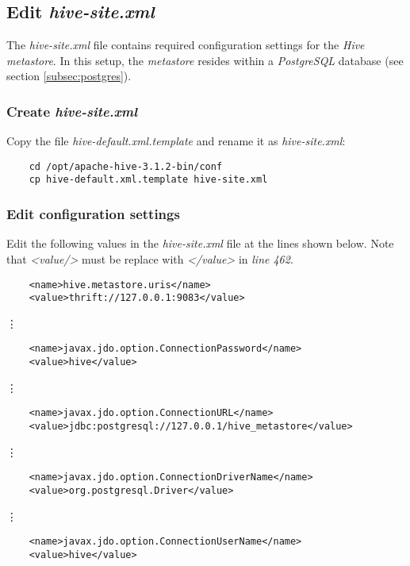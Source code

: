 \documentclass{article}
\begin{document}
  \subsection{Edit \emph{hive-site.xml}}
  The \emph{hive-site.xml} file contains required configuration settings for the
  \emph{Hive metastore}. In this setup, the \emph{metastore} resides within a \emph{PostgreSQL}
  database (see section \ref{subsec:postgres}).

    \subsubsection{Create \emph{hive-site.xml}}
    Copy the file \emph{hive-default.xml.template} and rename it as \emph{hive-site.xml}:
    \begin{verbatim}
    cd /opt/apache-hive-3.1.2-bin/conf
    cp hive-default.xml.template hive-site.xml
    \end{verbatim}
        
    \subsubsection{Edit configuration settings}
    Edit the following values in the \emph{hive-site.xml} file at the lines shown below. Note
    that \emph{\textless value/\textgreater} must be replace with
    \emph{\textless /value\textgreater} in \emph{line 462}.
    \begin{verbatim}
    <name>hive.metastore.uris</name>
    <value>thrift://127.0.0.1:9083</value>
    \end{verbatim}
    \centerline{\vdots}
    \begin{verbatim}
    <name>javax.jdo.option.ConnectionPassword</name>
    <value>hive</value>
    \end{verbatim}
    \centerline{\vdots}
    \begin{verbatim}
    <name>javax.jdo.option.ConnectionURL</name>
    <value>jdbc:postgresql://127.0.0.1/hive_metastore</value>
    \end{verbatim}
    \centerline{\vdots}
    \begin{verbatim}
    <name>javax.jdo.option.ConnectionDriverName</name>
    <value>org.postgresql.Driver</value>
    \end{verbatim}
    \centerline{\vdots}
    \begin{verbatim}
    <name>javax.jdo.option.ConnectionUserName</name>
    <value>hive</value>
    \end{verbatim}
\end{document}
